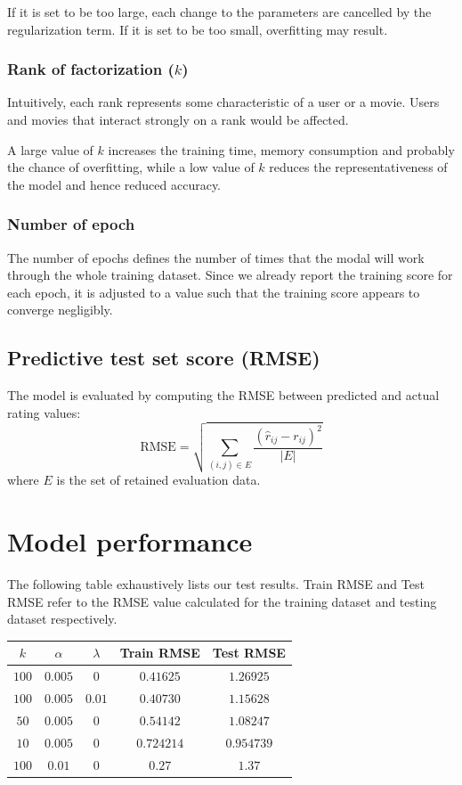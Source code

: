 \documentclass[final]{cvpr}
\begin{document}
If it is set to be too large, each change to the parameters are cancelled by the regularization term. If it is set to be too small, overfitting may result.

\subsubsection{Rank of factorization ($k$)}
Intuitively, each rank represents some characteristic of a user or a movie. Users and movies that interact strongly on a rank would be affected.

A large value of $k$ increases the training time, memory consumption and probably the chance of overfitting,
while a low value of $k$ reduces the representativeness of the model and hence reduced accuracy.

\subsubsection{Number of epoch}
The number of epochs defines the number of times that the modal will work through the whole training dataset.
Since we already report the training score for each epoch, it is adjusted to a value such that the training score appears to converge negligibly.

\subsection{Predictive test set score (RMSE)}
The model is evaluated by computing the RMSE between predicted and actual rating values:
$$ \text{RMSE} = \sqrt{\sum_{(i, j) \in E} \frac{{(\hat r_{ij} - r_{ij})}^2}{\left| E \right|}} $$
where $E$ is the set of retained evaluation data.

\section{Model performance}
The following table exhaustively lists our test results. Train RMSE and Test RMSE refer to the RMSE value calculated for the training dataset and testing dataset respectively.

\begin{tabular}{| c | c | c | c | c |}
    \hline
		$k$ & $\alpha$ &  $\lambda$ & Train RMSE & Test RMSE \\
    \hline
		$100$ & $0.005$ & $0$ & $0.41625$ & $1.26925$ \\
    \hline
		$100$ & $0.005$ & $0.01$ & $0.40730$ & $1.15628$ \\
    \hline
		$50$ & $0.005$ & $0$ & $0.54142$ & $1.08247$ \\
    \hline
		$10$ & $0.005$ & $0$ & $0.724214$ & $0.954739$ \\
    \hline
		$100$ & $0.01$ & $0$ & $0.27$ & $1.37$ \\
    \hline
\end{tabular}\\
\end{document}
